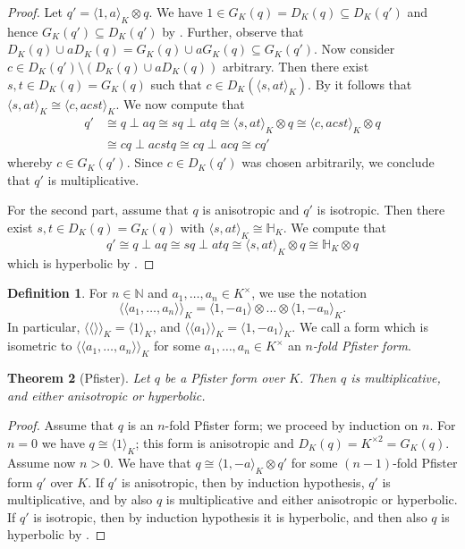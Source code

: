 \documentclass[12pt, leqno, british]{amsart}
\theoremstyle{definition}
\newtheorem{defi}{Definition}[subsection]
\theoremstyle{plain}
\newtheorem{thm}[defi]{Theorem}
\theoremstyle{remark}
\newcommand{\mbb}{\mathbb}
\newcommand{\nat}{\mbb N}
\newcommand{\llangle}{\langle\!\langle}
\newcommand{\rrangle}{\rangle\!\rangle}
\begin{document}
\begin{proof}
Let $q' = \langle 1, a \rangle_K \otimes q$. We have $1 \in G_K(q) = D_K(q) \subseteq D_K(q')$ and hence $G_K(q') \subseteq D_K(q')$ by .
Further, observe that $D_K(q) \cup aD_K(q) = G_K(q) \cup aG_K(q) \subseteq G_K(q')$. 
Now consider $c \in D_K(q') \setminus (D_K(q) \cup aD_K(q))$ arbitrary.
Then there exist $s, t \in D_K(q) = G_K(q)$ such that $c \in D_K(\langle s, at \rangle_K)$.
By  it follows that $\langle s, at \rangle_K \cong \langle c, acst \rangle_K$.
We now compute that
\begin{align*}
q' &\cong q \perp a q \cong sq \perp atq \cong \langle s, at \rangle_K \otimes q \cong \langle c, acst \rangle_K \otimes q \\
&\cong cq \perp acstq \cong cq \perp acq \cong cq'
\end{align*}
whereby $c \in G_K(q')$.
Since $c \in D_K(q')$ was chosen arbitrarily, we conclude that $q'$ is multiplicative.

For the second part, assume that $q$ is anisotropic and $q'$ is isotropic.
Then there exist $s, t \in D_K(q) = G_K(q)$ with $\langle s, at \rangle_K \cong \mbb{H}_K$.
We compute that
$$ q' \cong q \perp aq \cong sq \perp atq \cong \langle s, at \rangle_K \otimes q \cong \mbb{H}_K \otimes q $$
which is hyperbolic by .
\end{proof}
\begin{defi}
For $n \in \nat$ and $a_1, \ldots, a_n \in K^\times$, we use the notation
$$ \llangle a_1, \ldots, a_n \rrangle_K = \langle 1, -a_1 \rangle \otimes \ldots \otimes \langle 1, -a_n \rangle_K. $$
In particular, $\llangle \rrangle_K = \langle 1 \rangle_K$, and $\llangle a_1 \rrangle_K = \langle 1, -a_1 \rangle_K$.
We call a form which is isometric to $\llangle a_1, \ldots, a_n \rrangle_K$ for some $a_1, \ldots, a_n \in K^\times$ an \emph{$n$-fold Pfister form}.
\end{defi}
\begin{thm}[Pfister]\label{T:Pfister-forms}
Let $q$ be a Pfister form over $K$.
Then $q$ is multiplicative, and either anisotropic or hyperbolic.
\end{thm}
\begin{proof}
Assume that $q$ is an $n$-fold Pfister form; we proceed by induction on $n$.
For $n = 0$ we have $q \cong \langle 1 \rangle_K$; this form is anisotropic and $D_K(q) = K^{\times 2} = G_K(q)$.
Assume now $n > 0$.
We have that $q \cong \langle 1, -a \rangle_K \otimes q'$ for some $(n-1)$-fold Pfister form $q'$ over $K$.
If $q'$ is anisotropic, then by induction hypothesis, $q'$ is multiplicative, and by  also $q$ is multiplicative and either anisotropic or hyperbolic.
If $q'$ is isotropic, then by induction hypothesis it is hyperbolic, and then also $q$ is hyperbolic by .
\end{proof}
\end{document}
